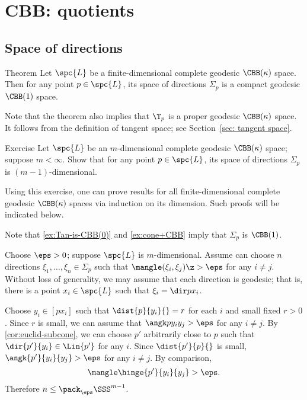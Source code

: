 \chapter{CBB: quotients}

\section{Space of directions}

\begin{thm}{Theorem}\label{thm:finite-space-of-directions}
Let $\spc{L}$ be a finite-dimensional complete geodesic $\CBB(\kappa)$ space.
Then for any point $p\in \spc{L}$, its space of directions $\Sigma_p$ is a compact geodesic $\CBB(1)$ space.
\end{thm}

Note that the theorem also implies that $\T_p$ is a proper geodesic $\CBB(\kappa)$ space.
It follows from the definition of tangent space; see Section~\ref{sec: tangent space}.


\begin{thm}{Exercise}\label{ex:finite-space-of-directions-dim}
Let $\spc{L}$ be an $m$-dimensional complete geodesic $\CBB(\kappa)$ space;
suppose $m<\infty$.
Show that for any point $p\in \spc{L}$, its space of directions $\Sigma_p$ is $(m-1)$-dimensional.
\end{thm}

Using this exercise, one can prove results for all finite-dimensional complete geodesic $\CBB(\kappa)$ spaces via induction on its dimension.
Such proofs will be indicated below.

Note that \ref{ex:Tan-is-CBB(0)} and \ref{ex:cone+CBB} imply that $\Sigma_p$ is $\CBB(1)$.

Choose $\eps>0$; suppose $\spc{L}$ is $m$-dimensional.
Assume can choose $n$ directions $\xi_1,\dots, \xi_n\in \Sigma_p$ such that $\mangle(\xi_i,\xi_j)\z>\eps$ for any $i\ne j$.
Without loss of generality, we may assume that each direction is geodesic;
that is, there is a point $x_i\in \spc{L}$ such that $\xi_i=\dir p{x_i}$.

Choose $y_i\in [px_i]$ such that $\dist{p}{y_i}{}=r$ for each $i$ and small fixed $r>0$.
Since $r$ is small, we can assume that $\angk p{y_i}{y_j}>\eps$ for any $i\ne j$.
By \ref{cor:euclid-subcone}, we can choose $p'$ arbitrarily close to $p$ such that $\dir{p'}{y_i}\in \Lin{p'}$ for any $i$.
Since  $\dist{p'}{p}{}$ is small, $\angk {p'}{y_i}{y_j}>\eps$ for any $i\ne j$.
By comparison, 
\[\mangle \hinge{p'}{y_i}{y_j}>\eps.\]
Therefore $n\le \pack_\eps\SSS^{m-1}$.

